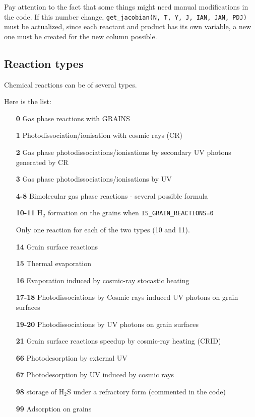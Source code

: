 \documentclass[english,a4paper,twoside]{article}
\newcommand{\molecule}[1]{\ensuremath{\mathrm{#1}}}
\begin{document}
\begin{attention}
Pay attention to the fact that some things might need manual modifications in the code. If this number change, \verb|get_jacobian(N, T, Y, J, IAN, JAN, PDJ)| must be actualized, since each reactant and product has its own variable, a new one must be created for the new column possible. 
\end{attention}

\subsection{Reaction types}
Chemical reactions can be of several types. 

Here is the list:
\begin{itemize}
\item[\textbf{0}] Gas phase reactions with GRAINS
\item[\textbf{1}] Photodissociation/ionisation with cosmic rays (CR)
\item[\textbf{2}] Gas phase photodissociations/ionisations by secondary UV photons generated by CR
\item[\textbf{3}] Gas phase photodissociations/ionisations by UV
\item[\textbf{4-8}] Bimolecular gas phase reactions - several possible formula 
\item[\textbf{10-11}] \molecule{H_2} formation on the grains when \verb|IS_GRAIN_REACTIONS=0|
\begin{remarque}
Only one reaction for each of the two types (10 and 11).
\end{remarque}
\item[\textbf{14}] Grain surface reactions
\item[\textbf{15}] Thermal evaporation
\item[\textbf{16}] Evaporation induced by cosmic-ray stocastic heating
\item[\textbf{17-18}] Photodissociations by Cosmic rays induced UV photons on grain surfaces
\item[\textbf{19-20}] Photodissociations by UV photons on grain surfaces
\item[\textbf{21}] Grain surface reactions speedup by cosmic-ray heating (CRID)
\item[\textbf{66}] Photodesorption by external UV
\item[\textbf{67}] Photodesorption by UV induced by cosmic rays
\item[\textbf{98}] storage of $\molecule{H_2S}$ under a refractory form (commented in the code)
\item[\textbf{99}] Adsorption on grains
\end{itemize}
\end{document}
